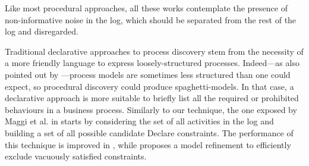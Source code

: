 Like most procedural approaches, all these works contemplate the presence of non-informative noise in the log, which should be separated from the rest of the log and disregarded.
 
Traditional declarative approaches to process discovery stem from the necessity of a more friendly language to express loosely-structured processes. Indeed---as also pointed out by \cite{2012-Maggi}---process models are sometimes less structured than one could expect, so procedural discovery could produce spaghetti-models. In that case, a declarative approach is more suitable to briefly list all the required or prohibited behaviours in a business process.
Similarly to our technique, the one exposed by Maggi et al. in \cite{2011-Maggi} starts by considering the set of all activities in the log and building a set of all possible candidate Declare constraints. 
%
The performance of this technique is improved in \cite{2012-Maggi}, 
while \cite{2012-Schunselaar} proposes a model refinement to efficiently exclude vacuously satisfied constraints. 


